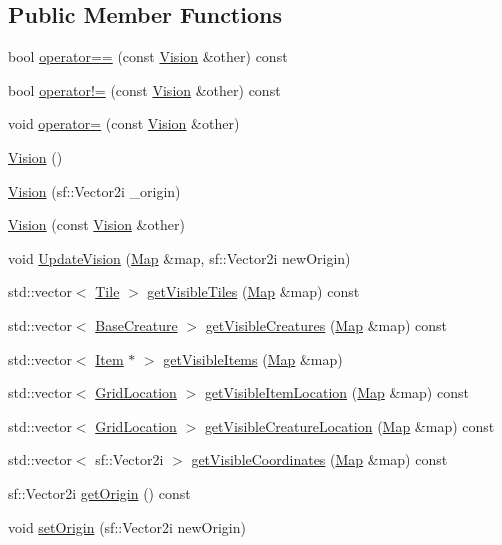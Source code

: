 \subsection*{Public Member Functions}
\begin{DoxyCompactItemize}
\item 
bool \mbox{\hyperlink{class_vision_a430c5fbcf645a99efe52a0b820c77e2e}{operator==}} (const \mbox{\hyperlink{class_vision}{Vision}} \&other) const
\item 
bool \mbox{\hyperlink{class_vision_ac71d59ce1d122996ae2a22dba22f2636}{operator!=}} (const \mbox{\hyperlink{class_vision}{Vision}} \&other) const
\item 
void \mbox{\hyperlink{class_vision_af3121eb4237a45afbcd98ca28f777e17}{operator=}} (const \mbox{\hyperlink{class_vision}{Vision}} \&other)
\item 
\mbox{\hyperlink{class_vision_ad6899fb359fd485afbd309d6d7b0ae1f}{Vision}} ()
\item 
\mbox{\hyperlink{class_vision_a8a9d1c5ab532eb9318d41e10586ecc34}{Vision}} (sf\+::\+Vector2i \+\_\+origin)
\item 
\mbox{\hyperlink{class_vision_adf510da4361cd8d1c5fa689e41088d62}{Vision}} (const \mbox{\hyperlink{class_vision}{Vision}} \&other)
\item 
void \mbox{\hyperlink{class_vision_a626452b58aa651ff91e4e60a74ce7443}{Update\+Vision}} (\mbox{\hyperlink{class_map}{Map}} \&map, sf\+::\+Vector2i new\+Origin)
\item 
std\+::vector$<$ \mbox{\hyperlink{class_tile}{Tile}} $>$ \mbox{\hyperlink{class_vision_a52683d5635319444a095ad79d6745c3b}{get\+Visible\+Tiles}} (\mbox{\hyperlink{class_map}{Map}} \&map) const
\item 
std\+::vector$<$ \mbox{\hyperlink{class_base_creature}{Base\+Creature}} $>$ \mbox{\hyperlink{class_vision_ad8806902c3144f15827fd93c1aabfa06}{get\+Visible\+Creatures}} (\mbox{\hyperlink{class_map}{Map}} \&map) const
\item 
std\+::vector$<$ \mbox{\hyperlink{class_item}{Item}} $\ast$ $>$ \mbox{\hyperlink{class_vision_a57e240a165d83bd1869e4053af0a4569}{get\+Visible\+Items}} (\mbox{\hyperlink{class_map}{Map}} \&map)
\item 
std\+::vector$<$ \mbox{\hyperlink{struct_grid_location}{Grid\+Location}} $>$ \mbox{\hyperlink{class_vision_aaada841a563a60650e2261796ff18713}{get\+Visible\+Item\+Location}} (\mbox{\hyperlink{class_map}{Map}} \&map) const
\item 
std\+::vector$<$ \mbox{\hyperlink{struct_grid_location}{Grid\+Location}} $>$ \mbox{\hyperlink{class_vision_a8047527dbf01dfaafdb41493a5b615de}{get\+Visible\+Creature\+Location}} (\mbox{\hyperlink{class_map}{Map}} \&map) const
\item 
std\+::vector$<$ sf\+::\+Vector2i $>$ \mbox{\hyperlink{class_vision_adda6f028099b3685f4d822ba5c62ac47}{get\+Visible\+Coordinates}} (\mbox{\hyperlink{class_map}{Map}} \&map) const
\item 
sf\+::\+Vector2i \mbox{\hyperlink{class_vision_a4ff74199025d8054955f6bd335b5699d}{get\+Origin}} () const
\item 
void \mbox{\hyperlink{class_vision_a5f26ef8f946b7cf29e533797bf474954}{set\+Origin}} (sf\+::\+Vector2i new\+Origin)
\end{DoxyCompactItemize}
